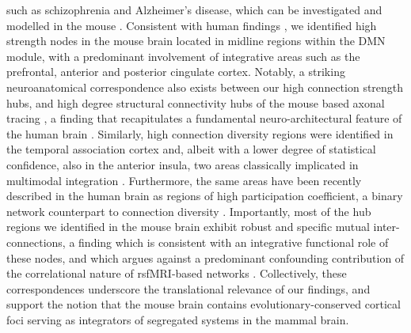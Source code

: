such as schizophrenia and Alzheimer’s disease, which can be investigated and
modelled in the mouse \parencite{buckner2009, crossley2014}. Consistent with
human findings \parencite{cole2010}, we identified high strength nodes in the
mouse brain located in midline regions within the DMN module, with a predominant
involvement of integrative areas such as the prefrontal, anterior and posterior
cingulate cortex. Notably, a striking neuroanatomical correspondence also exists
between our high connection strength hubs, and high degree structural
connectivity hubs of the mouse based axonal tracing \parencite{stafford2014}, a
finding that recapitulates a fundamental neuro-architectural feature of the
human brain \parencite{vandenheuvel2013}. Similarly, high connection
diversity regions were identified in the temporal association cortex and, albeit
with a lower degree of statistical confidence, also in the anterior insula, two
areas classically implicated in multimodal integration \parencite{gogolla2014}.
Furthermore, the same areas have been recently described in the human brain as
regions of high participation coefficient, a binary network counterpart to
connection diversity \parencite{power2013}. Importantly, most of the hub regions
we identified in the mouse brain exhibit robust and specific mutual
inter-connections, a finding which is consistent with an integrative functional
role of these nodes, and which argues against a predominant confounding
contribution of the correlational nature of rsfMRI-based networks
\parencite{power2013}.  Collectively, these correspondences underscore the
translational relevance of our findings, and support the notion that the mouse
brain contains evolutionary-conserved cortical foci serving as integrators of
segregated systems in the mammal brain.

